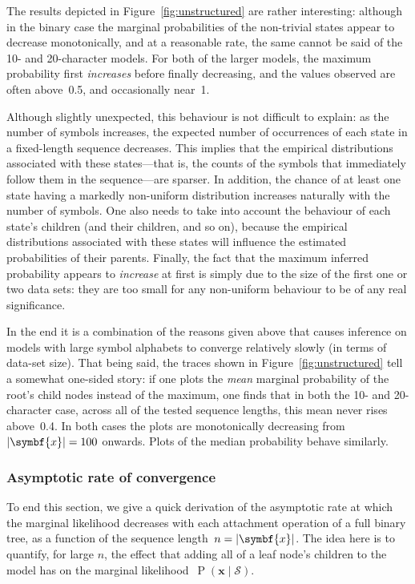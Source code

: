 \documentclass[12pt,a4paper]{article}
\newcommand\mc[1]{\mathcal{#1}}               %
\newcommand\ub[1]{\symbf{#1}}                 %
\DeclareMathOperator\Pb{P}                    %
\DeclarePairedDelimiter\abs{\lvert}{\rvert}   %
\begin{document}
The results depicted in Figure~\ref{fig:unstructured} are rather interesting:
although in the binary case the marginal probabilities of the non-trivial states
appear to decrease monotonically, and at a reasonable rate, the same cannot be
said of the 10- and 20-character models. For both of the larger models, the
maximum probability first \emph{increases} before finally decreasing, and the
values observed are often above~0.5, and occasionally near~1.

Although slightly unexpected, this behaviour is not difficult to explain: as the
number of symbols increases, the expected number of occurrences of each state in
a fixed-length sequence decreases. This implies that the empirical distributions
associated with these states---that is, the counts of the symbols that
immediately follow them in the sequence---are sparser. In addition, the chance
of at least one state having a markedly non-uniform distribution increases
naturally with the number of symbols. One also needs to take into account the
behaviour of each state's children (and their children, and so on), because the
empirical distributions associated with these states will influence the
estimated probabilities of their parents. Finally, the fact that the maximum
inferred probability appears to \emph{increase} at first is simply due to the
size of the first one or two data sets: they are too small for any non-uniform
behaviour to be of any real significance.

In the end it is a combination of the reasons given above that causes inference
on models with large symbol alphabets to converge relatively slowly (in terms of
data-set size). That being said, the traces shown in
Figure~\ref{fig:unstructured} tell a somewhat one-sided story: if one plots the
\emph{mean} marginal probability of the root's child nodes instead of the
maximum, one finds that in both the 10- and 20-character case, across all of the
tested sequence lengths, this mean never rises above~0.4. In both cases the
plots are monotonically decreasing from~\(\abs{\ub{x}} = 100\) onwards. Plots of
the median probability behave similarly.

\subsubsection{Asymptotic rate of convergence}\label{sec:asymptotic} %

To end this section, we give a quick derivation of the asymptotic rate at which
the marginal likelihood decreases with each attachment operation of a full
binary tree, as a function of the sequence length~\(n = \abs{\ub{x}}\). The idea
here is to quantify, for large \(n\), the effect that adding all of a leaf
node's children to the model has on the marginal likelihood~\(\Pb(\ub{x} \mid
\mc{S})\).
\end{document}
